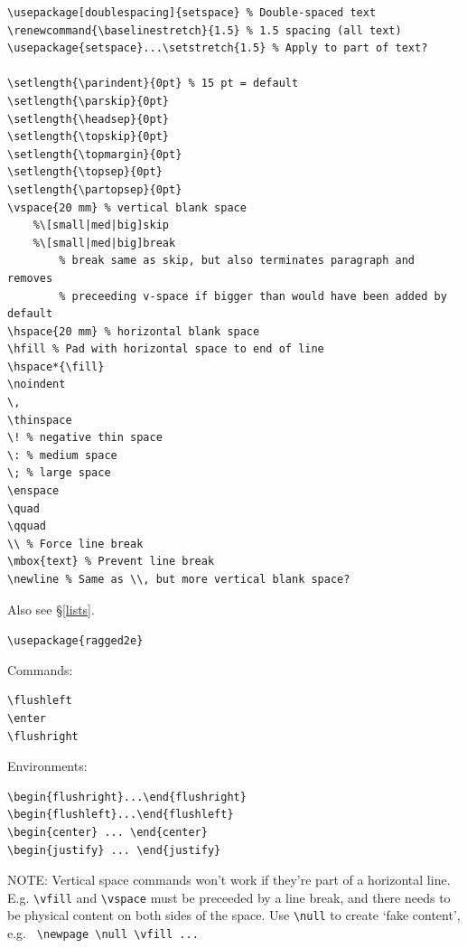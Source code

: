 \documentclass{article}
\begin{document}
\begin{lstlisting}
\usepackage[doublespacing]{setspace} % Double-spaced text
\renewcommand{\baselinestretch}{1.5} % 1.5 spacing (all text)
\usepackage{setspace}...\setstretch{1.5} % Apply to part of text?

\setlength{\parindent}{0pt} % 15 pt = default
\setlength{\parskip}{0pt}
\setlength{\headsep}{0pt}
\setlength{\topskip}{0pt}
\setlength{\topmargin}{0pt}
\setlength{\topsep}{0pt}
\setlength{\partopsep}{0pt}
\vspace{20 mm} % vertical blank space
    %\[small|med|big]skip
    %\[small|med|big]break
        % break same as skip, but also terminates paragraph and removes
        % preceeding v-space if bigger than would have been added by default
\hspace{20 mm} % horizontal blank space
\hfill % Pad with horizontal space to end of line
\hspace*{\fill}
\noindent
\,
\thinspace
\! % negative thin space
\: % medium space
\; % large space
\enspace
\quad
\qquad
\\ % Force line break
\mbox{text} % Prevent line break
\newline % Same as \\, but more vertical blank space?
\end{lstlisting}
Also see \S\ref{lists}.

\verb|\usepackage{ragged2e}|

\begin{minipage}{0.5\textwidth}
Commands:
\begin{lstlisting}
\flushleft
\enter
\flushright
\end{lstlisting}
\end{minipage}
\begin{minipage}{0.5\textwidth}
Environments:
\begin{lstlisting}
\begin{flushright}...\end{flushright}
\begin{flushleft}...\end{flushleft}
\begin{center} ... \end{center}
\begin{justify} ... \end{justify}
\end{lstlisting}
\end{minipage}

NOTE: Vertical space commands won't work if they're part of a horizontal line.
E.g. \verb|\vfill| and \verb|\vspace| must be preceeded by a line break,
and there needs
to be physical content on both sides of the space.
Use \verb|\null| to create `fake content', e.g.
\verb| \newpage \null \vfill ... |
\end{document}
